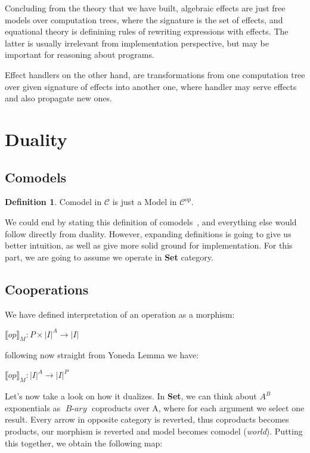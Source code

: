 \documentclass[declaration,shortabstract]{iithesis}
\theoremstyle{definition} \newtheorem{definition}{Definition}[chapter]
\theoremstyle{remark} \newtheorem{remark}[definition]{Observation}
\theoremstyle{plain} \newtheorem{theorem}[definition]{Theorem}
\theoremstyle{plain} \newtheorem{lemma}[definition]{Lemma}
\newcommand{\mathVar}[1]{{\operatorname{\mathit{#1}}}}
\begin{document}
Concluding from the theory that we have built, algebraic effects are just free
models over computation trees, where the signature is the set of effects, and
equational theory is definining rules of rewriting expressions with effects.
The latter is usually irrelevant from implementation perspective, but may be
important for reasoning about programs.

Effect handlers on the other hand, are transformations from one computation
tree over given signature of effects into another one, where handler may serve
effects and also propagate new ones.

\section{Duality}
    \subsection{Comodels}

    \begin{definition}
        Comodel in $\mathcal{C}$ is just a Model in $ \mathcal{C}^{op} $.
    \end{definition}

    We could end by stating this definition of comodels~\cite{comodels}, and
    everything else would follow directly from duality. However, expanding
    definitions is going to give us better intuition, as well as give more solid
    ground for implementation. For this part, we are going to assume we operate
    in \textbf{Set} category.

    \subsection{Cooperations}

    We have defined interpretation of an operation as a morphism:

    \begin{center}
        $ {\llbracket op \rrbracket}_M : P \times {|I|}^{A} \rightarrow |I| $
    \end{center}

    \noindent
    following now straight from Yoneda Lemma we have:

    \begin{center}
        $ {\llbracket op \rrbracket}_M : {|I|}^{A} \rightarrow |I|^{P} $
    \end{center}

    \noindent
    Let's now take a look on how it dualizes. In \textbf{Set}, we can think about
    $A^{B}$ exponentials as $\mathVar{B-ary}$ coproducts over A, where for each
    argument we select one result. Every arrow in opposite category is reverted,
    thus coproducts becomes products, our morphism is reverted and model becomes
    comodel (\textit{world}). Putting this together, we obtain the following map:
\end{document}
